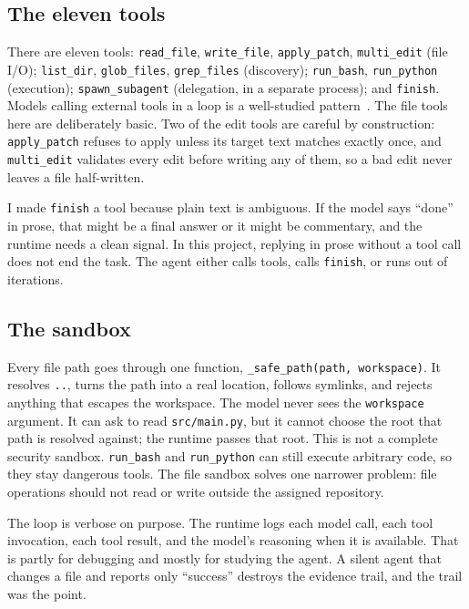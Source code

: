 \documentclass[11pt]{article}
\newcommand{\code}[1]{\texttt{\small #1}}
\begin{document}
\subsection{The eleven tools}
There are eleven tools: \code{read\_file}, \code{write\_file}, \code{apply\_patch}, \code{multi\_edit}
(file I/O); \code{list\_dir}, \code{glob\_files}, \code{grep\_files} (discovery); \code{run\_bash},
\code{run\_python} (execution); \code{spawn\_subagent} (delegation, in a separate process); and
\code{finish}. Models calling external tools in a loop is a well-studied pattern~\cite{toolformer}. The
file tools here are deliberately basic. Two of the edit tools are careful by construction:
\code{apply\_patch} refuses to apply unless its target text matches exactly once, and \code{multi\_edit}
validates every edit before writing any of them, so a bad edit never leaves a file half-written.

I made \code{finish} a tool because plain text is ambiguous. If the model says ``done'' in prose, that
might be a final answer or it might be commentary, and the runtime needs a clean signal. In this project,
replying in prose without a tool call does not end the task. The agent either calls tools, calls
\code{finish}, or runs out of iterations.

\subsection{The sandbox}
Every file path goes through one function, \code{\_safe\_path(path, workspace)}. It resolves \code{..},
turns the path into a real location, follows symlinks, and rejects anything that escapes the workspace.
The model never sees the \code{workspace} argument. It can ask to read \code{src/main.py}, but it cannot
choose the root that path is resolved against; the runtime passes that root. This is not a complete
security sandbox. \code{run\_bash} and \code{run\_python} can still execute arbitrary code, so they stay
dangerous tools. The file sandbox solves one narrower problem: file operations should not read or write
outside the assigned repository.

The loop is verbose on purpose. The runtime logs each model call, each tool invocation, each tool result,
and the model's reasoning when it is available. That is partly for debugging and mostly for studying the
agent. A silent agent that changes a file and reports only ``success'' destroys the evidence trail, and
the trail was the point.
\end{document}
